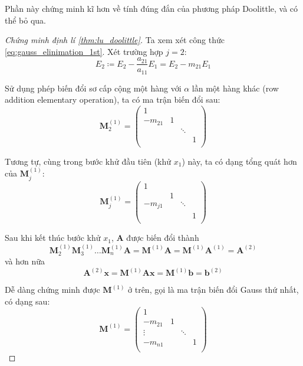 \documentclass[../../Lectures]{subfiles}
\begin{document}
Phần này chứng minh kĩ hơn về tính đúng đắn của phương pháp Doolittle, và có thể
bỏ qua.

\begin{proof}[Chứng minh định lí \ref{thm:lu_doolittle}]

    Ta xem xét công thức \eqref{eq:gauss_elinimation_1st}. Xét trường hợp \(j =
    2\):
    \[E_2 \coloneqq E_2 - \frac{a_{21}}{a_{11}} E_1 = E_2 - m_{21} E_1\]

    Sử dụng phép biến đổi sơ cấp cộng một hàng với \(\alpha\) lần một hàng khác
    (row addition elementary operation), ta có ma trận biến đổi sau:
    \[
        \bm{M}_2^{(1)} =
            \begin{pmatrix}
                    1    &     &          &     \\
                -m_{21}  &  1  &          &     \\
                         &     &  \ddots  &     \\
                         &     &          &  1  \\
            \end{pmatrix}
    \]

    Tương tự, cùng trong bước khử đầu tiên (khử \(x_1\)) này, ta có dạng tổng
    quát hơn của \(\bm{M}_j^{(1)}\):
    \[
        \bm{M}_j^{(1)} =
            \begin{pmatrix}
                1        &     &          &     \\
                         &  1  &          &     \\
                -m_{j1}  &     &  \ddots  &     \\
                         &     &          &  1  \\
            \end{pmatrix}
    \]

    Sau khi kết thúc bước khử \(x_1\), \(\bm{A}\) được biến đổi thành
    \[
        \bm{M}_2^{(1)} \bm{M}_3^{(1)} \ldots \bm{M}_n^{(1)} \bm{A} = \bm{M}^{(1)} \bm{A} = \bm{M}^{(1)} \bm{A}^{(1)} = \bm{A}^{(2)}
    \]
    và hơn nữa
    \[
        \bm{A}^{(2)} \bm{x} = \bm{M}^{(1)} \bm{A} \bm{x} = \bm{M}^{(1)} \bm{b} = \bm{b}^{(2)}
    \]

    Dễ dàng chứng minh được \(\bm{M}^{(1)}\) ở trên, gọi là ma trận biến đổi
    Gauss thứ nhất, có dạng sau:
    \[
        \bm{M}^{(1)} =
            \begin{pmatrix}
                    1    &     &          &     \\
                -m_{21}  &  1  &          &     \\
                \vdots   &     &  \ddots  &     \\
                -m_{n1}  &     &          &  1  \\
            \end{pmatrix}
    \]


\end{proof}
\end{document}
